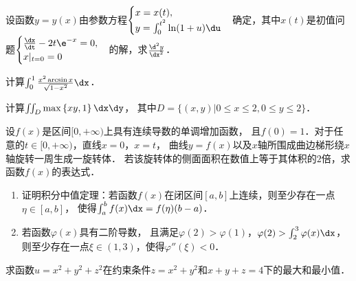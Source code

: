 \documentclass[plain,noanswer,medmath]{../../template/jnuexam}
\begin{document}




\begin{problem}[points=10]
设函数$y = y(x)$由参数方程$\begin{cases}
  x = x(t), \\
  y = \int_0^{t^2} \ln(1 + u)\du
\end{cases}$确定，其中$x(t)$是初值问题$\begin{cases}
  \frac{\dx}{\dt} - 2t\e^{- x} = 0, \\
  x|_{t = 0} = 0
\end{cases}$的解，求$\frac{\d^2y}{\dx^2}$．
\end{problem}


\begin{problem}[points=9]
计算$\int_0^1 \frac{x^2\arcsin x}{\sqrt{1 - x^2}} \dx$．
\end{problem}


\begin{problem}[points=11]
计算$\iint_D \max \left\{xy,1 \right\} \dx\dy$，
其中$D = \{\left. (x,y) \right|0 \le x \le 2,0 \le y \le 2\}$．
\end{problem}


\begin{problem}[points=11]
设$f(x)$是区间$[0, +\infty)$上具有连续导数的单调增加函数，
且$f(0) = 1$．对于任意的$t \in[0, +\infty)$，直线$x = 0$，$x = t$，
曲线$y = f(x)$以及$x$轴所围成曲边梯形绕$x$轴旋转一周生成一旋转体．
若该旋转体的侧面面积在数值上等于其体积的$2$倍，求函数$f(x)$的表达式．
\end{problem}


\begin{problem}[points=11]
\begin{enumerate}
\item 证明积分中值定理：若函数$f(x)$在闭区间$[a,b]$上连续，则至少存在一点$\eta\in[a,b]$，
      使得$\int_a^b f(x)\dx = f(\eta)(b - a)$．
\item 若函数$\varphi (x)$具有二阶导数，
      且满足$\varphi(2) > \varphi(1)$，$\varphi(2) > \int_2^3\varphi(x)\dx$，
      则至少存在一点$\xi \in(1,3)$，$\text{使得}\varphi''(\xi) < 0$．
\end{enumerate}
\end{problem}


\begin{problem}[points=11]
求函数$u = x^2 + y^2 + z^2$在约束条件$z = x^2 + y^2$和$x + y + z = 4$下的最大和最\goodbreak 小值．
\end{problem}
\end{document}
